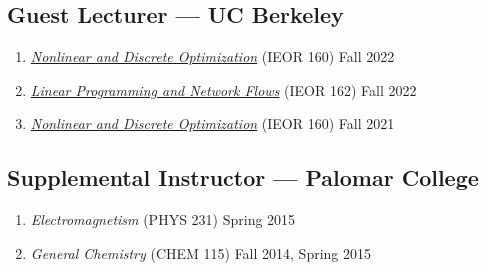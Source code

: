 \documentclass[11pt]{article}
\newcommand{\subsectionskip}{\baselineskip}	%
\newcommand{\cvdate}[1]{\hfill#1}			%
\begin{document}
	\vspace*{\subsectionskip}

	\subsection{Guest Lecturer --- UC Berkeley}

	\begin{enumerate}[label={\arabic*.}]
		\item \href{https://lavaei.ieor.berkeley.edu/Course_IEOR160_Fall_2022.html}{\textit{Nonlinear and Discrete Optimization}} (IEOR 160) \cvdate{Fall 2022}
		\item \href{https://lavaei.ieor.berkeley.edu/Course_IEOR162_Fall_2022.html}{\textit{Linear Programming and Network Flows}} (IEOR 162) \cvdate{Fall 2022}
		\item \href{https://lavaei.ieor.berkeley.edu/Course_IEOR160_Fall_2021.html}{\textit{Nonlinear and Discrete Optimization}} (IEOR 160) \cvdate{Fall 2021}
	\end{enumerate}

	\vspace*{\subsectionskip}
	
	\subsection{Supplemental Instructor --- Palomar College}	
	\begin{enumerate}[label={\arabic*.}]
		\item \textit{Electromagnetism} (PHYS 231) \cvdate{Spring 2015}
		\item \textit{General Chemistry} (CHEM 115) \cvdate{Fall 2014, Spring 2015}
	\end{enumerate}

\end{document}
